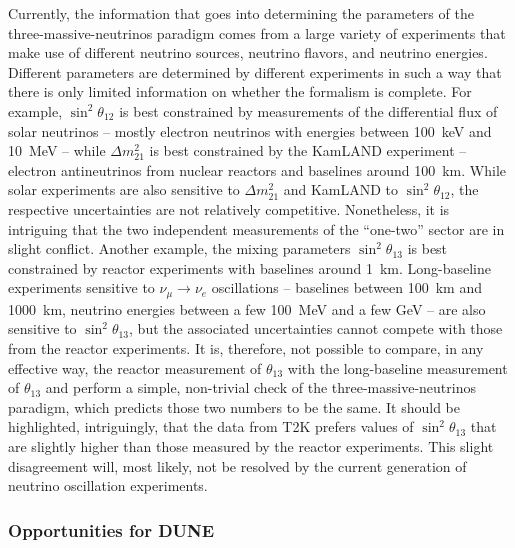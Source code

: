 Currently, the information that goes into determining the parameters of the three-massive-neutrinos paradigm comes from a large variety of experiments that make use of different neutrino sources, neutrino flavors, and neutrino energies. Different parameters are determined by different experiments in such a way that there is only limited information on whether the formalism is complete. For example, $\sin^2\theta_{12}$ is best constrained by measurements of the differential flux of solar neutrinos -- mostly electron neutrinos with energies between 100~keV and 10~MeV  -- while $\Delta m^2_{21}$ is best constrained by the KamLAND experiment -- electron antineutrinos from nuclear reactors and baselines around 100~km. While solar experiments are also sensitive to $\Delta m^2_{21}$ and KamLAND to $\sin^2\theta_{12}$, the respective uncertainties are not relatively competitive. Nonetheless, it is intriguing that the two independent measurements of the ``one-two'' sector are in slight conflict. Another example, the mixing parameters $\sin^2\theta_{13}$ is best constrained by reactor experiments with baselines around 1~km. Long-baseline experiments sensitive to $\nu_{\mu}\to\nu_e$ oscillations -- baselines between 100~km and 1000~km, neutrino energies between a few 100~MeV and a few GeV -- are also sensitive to $\sin^2\theta_{13}$, but the associated uncertainties cannot compete with those from the reactor experiments. It is, therefore, not possible to compare, in any effective way, the reactor measurement of $\theta_{13}$ with the long-baseline measurement of $\theta_{13}$ and perform a simple, non-trivial check of the three-massive-neutrinos paradigm, which predicts those two numbers to be the same. It should be highlighted, intriguingly, that the data from T2K prefers values of  $\sin^2\theta_{13}$ that are slightly higher than those measured by the reactor experiments. This slight disagreement will, most likely, not be resolved by the current generation of neutrino oscillation experiments.

\subsubsection{Opportunities for DUNE}

